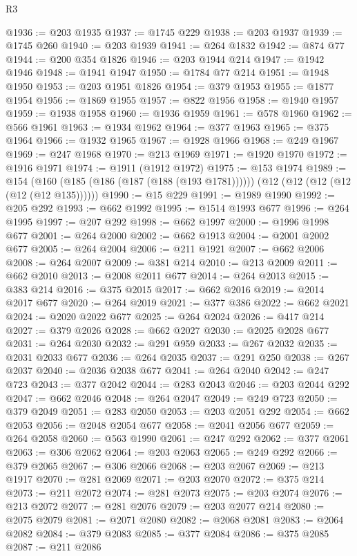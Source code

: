 \begin{lexlean}{R3}
\begin{coremodule}
@1936 := @203 @1935
@1937 := @1745 @229
@1938 := @203 @1937
@1939 := @1745 @260
@1940 := @203 @1939
@1941 := @264 @1832
@1942 := @874 @77
@1944 := @200 @354 @1826
@1946 := @203 @1944 @214
@1947 := @1942 @1946
@1948 := @1941 @1947
@1950 := @1784 @77 @214
@1951 := @1948 @1950
@1953 := @203 @1951 @1826
@1954 := @379 @1953
@1955 := @1877 @1954
@1956 := @1869 @1955
@1957 := @822 @1956
@1958 := @1940 @1957
@1959 := @1938 @1958
@1960 := @1936 @1959
@1961 := @578 @1960
@1962 := @566 @1961
@1963 := @1934 @1962
@1964 := @377 @1963
@1965 := @375 @1964
@1966 := @1932 @1965
@1967 := @1928 @1966
@1968 := @249 @1967
@1969 := @247 @1968
@1970 := @213 @1969
@1971 := @1920 @1970
@1972 := @1916 @1971
@1974 := @1911 (@1912 @1972)
@1975 := @153 @1974
@1989 := @154
    (@160 (@185 (@186 (@187 (@188 (@193 @1781))))))
    (@12 (@12 (@12 (@12 (@12 (@12 @135))))))
@1990 := @15 @229
@1991 := @1989 @1990
@1992 := @205 @292
@1993 := @662 @1992
@1995 := @1514 @1993 @677
@1996 := @264 @1995
@1997 := @207 @292
@1998 := @662 @1997
@2000 := @1996 @1998 @677
@2001 := @264 @2000
@2002 := @662 @1913
@2004 := @2001 @2002 @677
@2005 := @264 @2004
@2006 := @211 @1921
@2007 := @662 @2006
@2008 := @264 @2007
@2009 := @381 @214
@2010 := @213 @2009
@2011 := @662 @2010
@2013 := @2008 @2011 @677
@2014 := @264 @2013
@2015 := @383 @214
@2016 := @375 @2015
@2017 := @662 @2016
@2019 := @2014 @2017 @677
@2020 := @264 @2019
@2021 := @377 @386
@2022 := @662 @2021
@2024 := @2020 @2022 @677
@2025 := @264 @2024
@2026 := @417 @214
@2027 := @379 @2026
@2028 := @662 @2027
@2030 := @2025 @2028 @677
@2031 := @264 @2030
@2032 := @291 @959
@2033 := @267 @2032
@2035 := @2031 @2033 @677
@2036 := @264 @2035
@2037 := @291 @250
@2038 := @267 @2037
@2040 := @2036 @2038 @677
@2041 := @264 @2040
@2042 := @247 @723
@2043 := @377 @2042
@2044 := @283 @2043
@2046 := @203 @2044 @292
@2047 := @662 @2046
@2048 := @264 @2047
@2049 := @249 @723
@2050 := @379 @2049
@2051 := @283 @2050
@2053 := @203 @2051 @292
@2054 := @662 @2053
@2056 := @2048 @2054 @677
@2058 := @2041 @2056 @677
@2059 := @264 @2058
@2060 := @563 @1990
@2061 := @247 @292
@2062 := @377 @2061
@2063 := @306 @2062
@2064 := @203 @2063
@2065 := @249 @292
@2066 := @379 @2065
@2067 := @306 @2066
@2068 := @203 @2067
@2069 := @213 @1917
@2070 := @281 @2069
@2071 := @203 @2070
@2072 := @375 @214
@2073 := @211 @2072
@2074 := @281 @2073
@2075 := @203 @2074
@2076 := @213 @2072
@2077 := @281 @2076
@2079 := @203 @2077 @214
@2080 := @2075 @2079
@2081 := @2071 @2080
@2082 := @2068 @2081
@2083 := @2064 @2082
@2084 := @379 @2083
@2085 := @377 @2084
@2086 := @375 @2085
@2087 := @211 @2086

\end{coremodule}
\end{lexlean}
